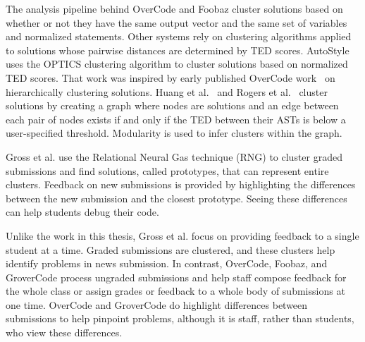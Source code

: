 The analysis pipeline behind OverCode and Foobaz cluster solutions based on whether or not they have the same output vector and the same set of variables and normalized statements. Other systems rely on clustering algorithms applied to solutions whose pairwise distances are determined by TED scores. AutoStyle~\cite{choudhury2016autostyle} uses the OPTICS clustering algorithm to cluster solutions based on normalized TED scores. That work was inspired by early published OverCode work~\cite{glassman2014feature} on hierarchically clustering solutions. Huang et al.~\cite{MOOCshop} and Rogers et al.~\cite{ACESthesis} cluster solutions by creating a graph where nodes are solutions and an edge between each pair of nodes exists if and only if the TED between their ASTs is below a user-specified threshold. Modularity is used to infer clusters within the graph. 

Gross et al. \cite{gross} use the Relational Neural Gas technique (RNG) to cluster graded submissions and find solutions, called prototypes, that can represent entire clusters. Feedback on new submissions is provided by highlighting the differences between the new submission and the closest prototype. Seeing these differences can help students debug their code. 

Unlike the work in this thesis, Gross et al. focus on providing feedback to a single student at a time. Graded submissions are clustered, and these clusters help identify problems in news submission. In contrast, OverCode, Foobaz, and GroverCode process ungraded submissions and help staff compose feedback for the whole class or assign grades or feedback to a whole body of submissions at one time. OverCode and GroverCode do highlight differences between submissions to help pinpoint problems, although it is staff, rather than students, who view these differences.

